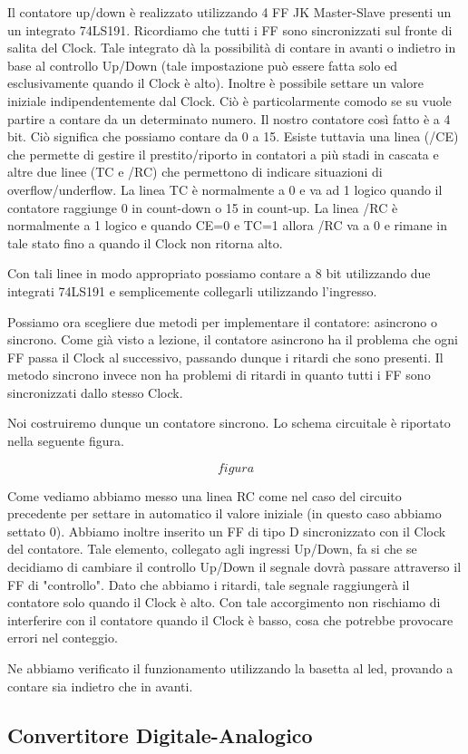 Il contatore up/down è realizzato utilizzando 4 FF JK Master-Slave presenti un un integrato 74LS191. Ricordiamo che tutti i FF sono sincronizzati sul fronte di salita del Clock. Tale integrato dà la possibilità di contare in avanti o indietro in base al controllo Up/Down (tale impostazione può essere fatta solo ed esclusivamente quando il Clock è alto). Inoltre è possibile settare un valore iniziale indipendentemente dal Clock. Ciò è particolarmente comodo se su vuole partire a contare da un determinato numero. Il nostro contatore così fatto è a 4 bit. Ciò significa che possiamo contare da 0 a 15. Esiste tuttavia una linea (/CE) che permette di gestire il prestito/riporto in contatori a più stadi in cascata e altre due linee (TC e /RC) che permettono di indicare situazioni di overflow/underflow. La linea TC è normalmente a 0 e va ad 1 logico quando il contatore raggiunge 0 in count-down o 15 in count-up. La linea /RC è normalmente a 1 logico e quando CE=0 e TC=1 allora /RC va a 0 e rimane in tale stato fino a quando il Clock non ritorna alto.

Con tali linee in modo appropriato possiamo contare a 8 bit utilizzando due integrati 74LS191 e semplicemente collegarli utilizzando l'ingresso.

Possiamo ora scegliere due metodi per implementare il contatore: asincrono o sincrono. Come già visto a lezione, il contatore asincrono ha il problema che ogni FF passa il Clock al successivo, passando dunque i ritardi che sono presenti. Il metodo sincrono invece non ha problemi di ritardi in quanto tutti i FF sono sincronizzati dallo stesso Clock. 

Noi costruiremo dunque un contatore sincrono. Lo schema circuitale è riportato nella seguente figura.

$$figura$$

Come vediamo abbiamo messo una linea RC come nel caso del circuito precedente per settare in automatico il valore iniziale (in questo caso abbiamo settato 0). Abbiamo inoltre inserito un FF di tipo D sincronizzato con il Clock del contatore. Tale elemento,  collegato agli ingressi Up/Down, fa si che se decidiamo di cambiare il controllo Up/Down il segnale dovrà passare attraverso il FF di "controllo". Dato che abbiamo i ritardi, tale segnale raggiungerà il contatore solo  quando il Clock è alto. Con tale accorgimento non rischiamo di interferire con il contatore quando il Clock è basso, cosa che potrebbe provocare errori nel conteggio.

Ne abbiamo verificato il funzionamento utilizzando la basetta al led, provando a contare sia indietro che in avanti. 

\subsection{Convertitore Digitale-Analogico}

